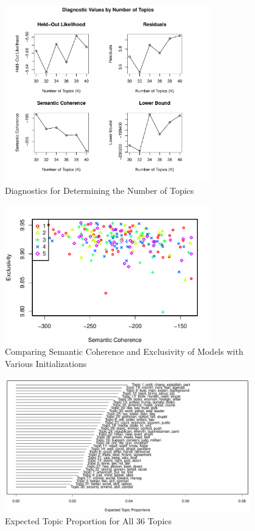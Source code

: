 \documentclass[12pt]{article}
\begin{document}
\begin{appendices}
\begin{refsection}
\begin{figure}[t!]
	\centering
	\includegraphics[width=0.8\textwidth]{Figures/STM-selectingK.pdf}
	\caption{Diagnostics for Determining the Number of Topics}
		\label{fig:selectingK}
\end{figure}


\begin{figure}[t!]
	\centering
	\includegraphics[width=0.8\textwidth]{Figures/STM-selectModel.pdf}
	\caption{Comparing Semantic Coherence and Exclusivity of Models with Various Initializations}\label{fig:selectModel}
\end{figure}


\clearpage
\begin{figure}[t!]
	\centering
	\includegraphics[width=0.95\textwidth]{Figures/STM-ExpectedTopicProportion.pdf}
	\caption{Expected Topic Proportion for All 36 Topics}
		\label{fig:alltopics}
\end{figure}



\end{refsection}
\end{appendices}
\end{document}
